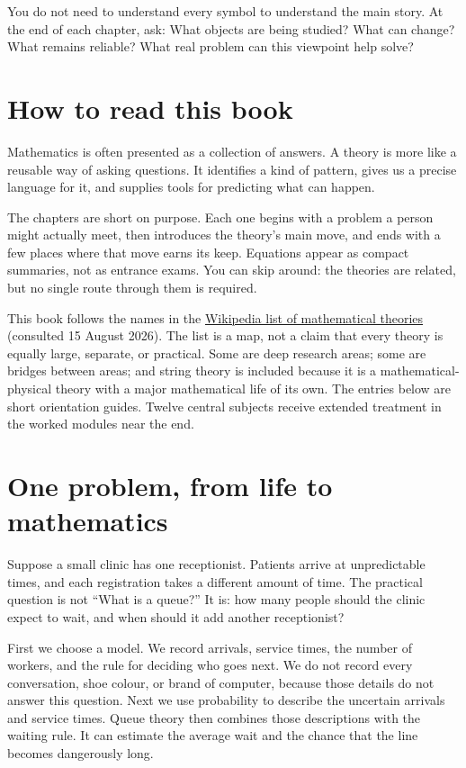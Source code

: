 \documentclass[11pt,oneside]{book}
\begin{document}
You do not need to understand every symbol to understand the main story. At the end of each chapter, ask: What objects are being studied? What can change? What remains reliable? What real problem can this viewpoint help solve?

\chapter*{How to read this book}
Mathematics is often presented as a collection of answers. A theory is more like a reusable way of asking questions. It identifies a kind of pattern, gives us a precise language for it, and supplies tools for predicting what can happen.

The chapters are short on purpose. Each one begins with a problem a person might actually meet, then introduces the theory's main move, and ends with a few places where that move earns its keep. Equations appear as compact summaries, not as entrance exams. You can skip around: the theories are related, but no single route through them is required.

This book follows the names in the \href{https://en.wikipedia.org/wiki/List_of_mathematical_theories}{Wikipedia list of mathematical theories} (consulted 15 August 2026). The list is a map, not a claim that every theory is equally large, separate, or practical. Some are deep research areas; some are bridges between areas; and string theory is included because it is a mathematical-physical theory with a major mathematical life of its own. The entries below are short orientation guides. Twelve central subjects receive extended treatment in the worked modules near the end.

\chapter*{One problem, from life to mathematics}
Suppose a small clinic has one receptionist. Patients arrive at unpredictable times, and each registration takes a different amount of time. The practical question is not ``What is a queue?'' It is: how many people should the clinic expect to wait, and when should it add another receptionist?

First we choose a model. We record arrivals, service times, the number of workers, and the rule for deciding who goes next. We do not record every conversation, shoe colour, or brand of computer, because those details do not answer this question. Next we use probability to describe the uncertain arrivals and service times. Queue theory then combines those descriptions with the waiting rule. It can estimate the average wait and the chance that the line becomes dangerously long.
\end{document}
